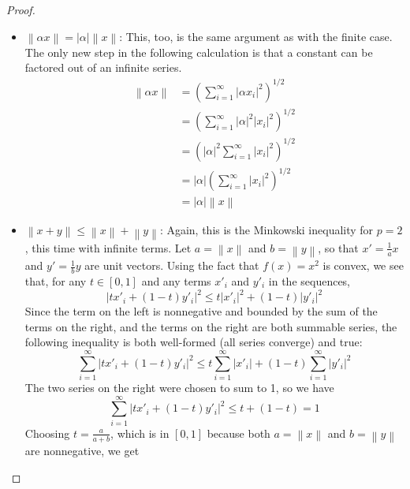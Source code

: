 \documentclass[12pt]{article}
\theoremstyle{definition}
\begin{document}
\begin{proof}
\begin{enumerate}[label=(\roman*)]
\begin{itemize}
			\item $\left \lVert { \alpha x } \right \lVert  = \left \lvert { \alpha } \right \lvert \left \lVert { x } \right \lVert $: This, too, is the same argument as with the finite case. The only new step in the following calculation is that a constant can be factored out of an infinite series.
				\begin{align*}
					\left \lVert { \alpha x } \right \lVert &= \left ( \sum_{i=1}^\infty \left \lvert { \alpha x_i } \right \lvert^2 \right )^{1/2}\\
					&= \left( \sum_{i=1}^\infty \left \lvert { \alpha } \right \lvert ^2 \left \lvert { x_i } \right \lvert ^2 \right)^{1/2}\\
					&= \left( \left \lvert { \alpha } \right \lvert ^2 \sum_{i=1}^\infty \left \lvert { x_i } \right \lvert ^2\right)^{1/2}\\
					&= \left \lvert { \alpha } \right \lvert \left( \sum_{i=1}^\infty \left \lvert { x_i } \right \lvert ^2 \right)^{1/2}\\
					&= \left \lvert {  \alpha } \right \lvert \left \lVert { x } \right \lVert 
				\end{align*}
			\item $\left \lVert { x + y } \right \lVert \leq \left \lVert { x } \right \lVert + \left \lVert { y } \right \lVert $: Again, this is the Minkowski inequality for $p=2$, this time with infinite terms. Let $a = \left \lVert { x } \right \lVert $ and $b = \left \lVert {  y } \right \lVert $, so that $x' = \frac{1}{a}x$ and $y' = \frac{1}{b}y$ are unit vectors. Using the fact that $f(x) = x^2$ is convex, we see that, for any $t \in [0,1]$ and any terms $x'_i$ and $y'_i$ in the sequences,
				\[\left \lvert { tx'_i + (1-t)y'_i } \right \lvert^2 \leq t\left \lvert { x'_i } \right \lvert ^2 + (1-t)\left \lvert { y'_i } \right \lvert ^2\]
			Since the term on the left is nonnegative and bounded by the sum of the terms on the right, and the terms on the right are both summable series, the following inequality is both well-formed (all series converge) and true:
			\[\sum_{i=1}^\infty \left \lvert { tx'_i + (1-t)y'_i } \right \lvert ^2 \leq t\sum_{i=1}^\infty \left \lvert { x'_i } \right \lvert  + (1-t)\sum_{i=1}^\infty \left \lvert { y'_i } \right \lvert ^2\]
			The two series on the right were chosen to sum to 1, so we have
			\[\sum_{i=1}^\infty \left \lvert { tx'_i + (1-t)y'_i } \right \lvert^2 \leq t + (1-t) = 1\]
			Choosing $ t = \frac{a}{a+b}$, which is in $[0,1]$ because both $a = \left \lVert { x } \right \lVert $ and $b = \left \lVert { y } \right \lVert $ are nonnegative, we get

\end{itemize}
\end{enumerate}
\end{proof}
\end{document}
